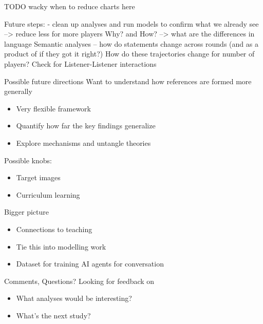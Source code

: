 \documentclass[ 12pt, xcolor=beamer,table,usenames,dvipsnames, ignorenonframetext, ngerman]{beamer}
\begin{document}
\begin{frame}
	TODO wacky when to reduce charts here
\end{frame}

\begin{frame}
	Future steps:
	- clean up analyses and run models to confirm what we already see
	--> reduce less for more players
	Why? and How?
	--> what are the differences in language
	Semantic analyses -- how do statements change across rounds (and as a product of if they got it right?)
	How do these trajectories change for number of players?
	Check for Listener-Listener interactions
\end{frame}


\begin{frame}{Possible future directions}
	Want to understand how references are formed more generally
	\begin{itemize}
	\item Very flexible framework \pause
	\item Quantify how far the key findings generalize \pause
	\item Explore mechanisms and untangle theories \pause
\end{itemize}
 Possible knobs:\pause
\begin{itemize}

	\item Target images \pause
	\item Curriculum learning
\end{itemize}

\end{frame}


\begin{frame}{Bigger picture}
	\begin{itemize}
		\item Connections to teaching \pause
		\item Tie this into modelling work \pause
		\item Dataset for training AI agents for conversation
	\end{itemize}
\end{frame}

\begin{frame}{Comments, Questions?}
	Looking for feedback on
	\smallskip
	\begin{itemize}
	\item What analyses would be interesting?
	\item What's the next study?
	\end{itemize}
\end{frame}
\end{document}
